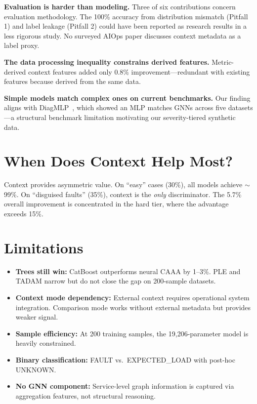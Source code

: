 \documentclass[12pt,a4paper]{report}
\begin{document}
\textbf{Evaluation is harder than modeling.} Three of six contributions concern evaluation methodology. The 100\% accuracy from distribution mismatch (Pitfall 1) and label leakage (Pitfall 2) could have been reported as research results in a less rigorous study. No surveyed AIOps paper discusses context metadata as a label proxy.

\textbf{The data processing inequality constrains derived features.} Metric-derived context features added only 0.8\% improvement---redundant with existing features because derived from the same data.

\textbf{Simple models match complex ones on current benchmarks.} Our finding aligns with DiagMLP~\cite{diagmlp2025}, which showed an MLP matches GNNs across five datasets---a structural benchmark limitation motivating our severity-tiered synthetic data.

\section{When Does Context Help Most?}

Context provides asymmetric value. On ``easy'' cases (30\%), all models achieve $\sim$99\%. On ``disguised faults'' (35\%), context is the \textit{only} discriminator. The 5.7\% overall improvement is concentrated in the hard tier, where the advantage exceeds 15\%.

\section{Limitations}

\begin{itemize}
    \item \textbf{Trees still win:} CatBoost outperforms neural CAAA by 1--3\%. PLE and TADAM narrow but do not close the gap on 200-sample datasets.
    \item \textbf{Context mode dependency:} External context requires operational system integration. Comparison mode works without external metadata but provides weaker signal.
    \item \textbf{Sample efficiency:} At 200 training samples, the 19,206-parameter model is heavily constrained.
    \item \textbf{Binary classification:} FAULT vs.\ EXPECTED\_LOAD with post-hoc UNKNOWN.
    \item \textbf{No GNN component:} Service-level graph information is captured via aggregation features, not structural reasoning.
\end{itemize}
\end{document}
